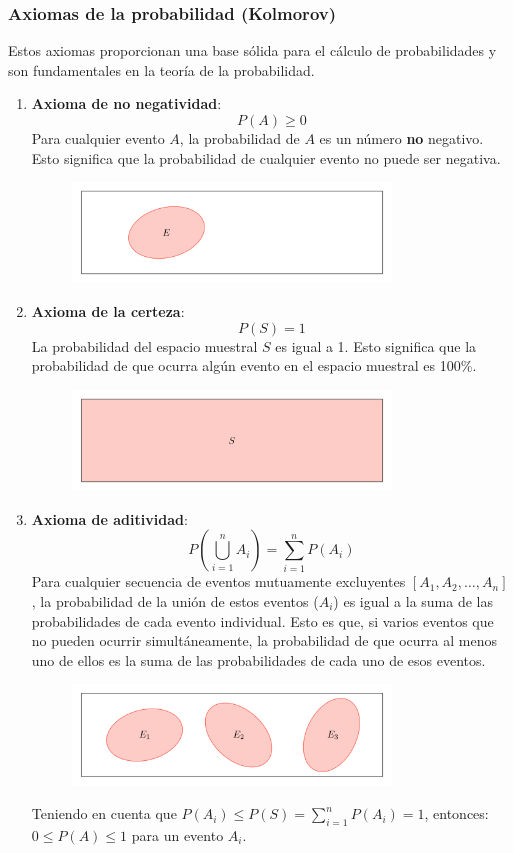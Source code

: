 \subsubsection{Axiomas de la probabilidad (Kolmorov)}
Estos axiomas proporcionan una base sólida para el cálculo de probabilidades y son fundamentales en la teoría de la probabilidad.
\begin{enumerate}
\item \textbf{Axioma de no negatividad}: 
$$P(A) \geq 0$$
Para cualquier evento $A$, la probabilidad de $A$ es un número \textbf{no} negativo. Esto significa que la probabilidad de cualquier evento no puede ser negativa.
\begin{figure}[h]
\centering
\includegraphics[width = 0.8\textwidth]{figs/probability-axiom-1.png}
\end{figure}

\item \textbf{Axioma de la certeza}: 
$$P(S) = 1$$
La probabilidad del espacio muestral $S$ es igual a 1. Esto significa que la probabilidad de que ocurra algún evento en el espacio muestral es 100\%.
\begin{figure}[h]
\centering
\includegraphics[width = 0.8\textwidth]{figs/probability-axiom-2.png}
\end{figure}

\item \textbf{Axioma de aditividad}: 
$$P\left(\bigcup_{i=1}^{n} A_i\right) = \sum_{i=1}^{n} P(A_i)$$
Para cualquier secuencia de eventos mutuamente excluyentes $[A_1,A_2,…,A_n]$, la probabilidad de la unión de estos eventos ($A_i$) es igual a la suma de las probabilidades de cada evento individual. Esto es que, si varios eventos que no pueden ocurrir simultáneamente, la probabilidad de que ocurra al menos uno de ellos es la suma de las probabilidades de cada uno de esos eventos.
\begin{figure}[h]
\centering
\includegraphics[width = 0.8\textwidth]{figs/probability-axiom-3.png}
\end{figure}
Teniendo en cuenta que $P(A_i) \leq P(S) = \sum_{i=1}^{n} P(A_i) = 1$, entonces: $0 \leq P(A) \leq 1$  para un evento $A_i$.


\end{enumerate}
